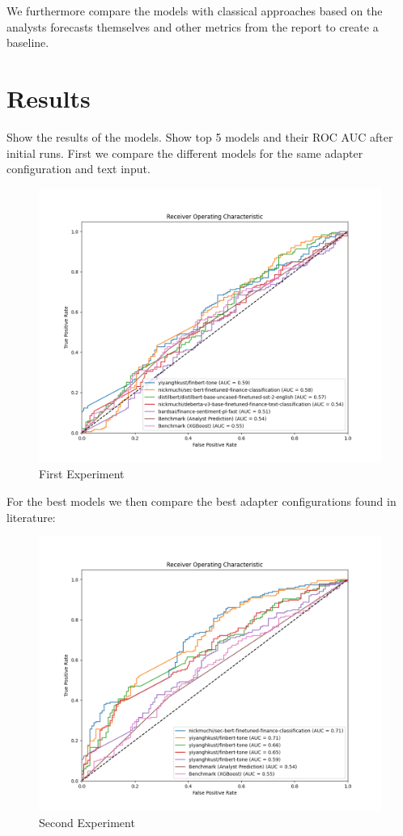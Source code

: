 \documentclass[conference]{IEEEtran}
\begin{document}
We furthermore compare the models with classical approaches based on the analysts forecasts themselves and other metrics from the report to create a baseline.

\newpage
\section{Results}%
Show the results of the models.  Show top 5 models and their ROC AUC after initial runs.
First we compare the different models for the same adapter configuration and text input.

\begin{figure}[h!]
    \centering
    \includegraphics[width=.65\linewidth]{../3. evaluation/roc_curves/experiment1_top_5_models.png}
    \caption[First Experiment]{First Experiment}
    \label{fig:Firstexp}
\end{figure}


For the best models we then compare the best adapter configurations found in literature:

\begin{figure}[h!]
    \centering
    \includegraphics[width=.65\linewidth]{../3. evaluation/roc_curves/experiment2_top_5_models.png}
    \caption[Second Experiment]{Second Experiment}
    \label{fig:Secondexp}
\end{figure}
\end{document}
